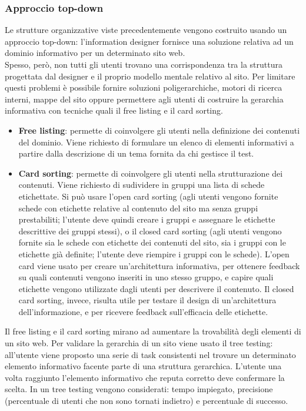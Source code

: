 \documentclass{article}
\begin{document}
\subsubsection{Approccio top-down}
Le strutture organizzative viste precedentemente vengono costruito usando un approccio top-down: l'information designer fornisce una soluzione relativa ad un dominio informativo per un determinato sito web.\\
Spesso, però, non tutti gli utenti trovano una corrispondenza tra la struttura progettata dal designer e il proprio modello mentale relativo al sito. Per limitare questi problemi è possibile fornire soluzioni poligerarchiche, motori di ricerca interni, mappe del sito oppure permettere agli utenti di costruire la gerarchia informativa con tecniche quali il free listing e il card sorting.
\begin{itemize}
	\item \textbf{Free listing}: permette di coinvolgere gli utenti nella definizione dei contenuti del dominio. Viene richiesto di formulare un elenco di elementi informativi a partire dalla descrizione di un tema fornita da chi gestisce il test.
	\item \textbf{Card sorting}: permette di coinvolgere gli utenti nella strutturazione dei contenuti. Viene richiesto di sudividere in gruppi una lista di schede etichettate. Si può usare l'open card sorting (agli utenti vengono fornite schede con etichette relative al contenuto del sito ma senza gruppi prestabiliti; l'utente deve quindi creare i gruppi e assegnare le etichette descrittive dei gruppi stessi), o il closed card sorting (agli utenti vengono fornite sia le schede con etichette dei contenuti del sito, sia i gruppi con le etichette già definite; l'utente deve riempire i gruppi con le schede). L'open card viene usato per creare un'architettura informativa, per ottenere feedback su quali contenuti vengono inseriti in uno stesso gruppo, e capire quali etichette vengono utilizzate dagli utenti per descrivere il contenuto.
	Il closed card sorting, invece, risulta utile per testare il design di un'architettura dell'informazione, e per ricevere feedback sull'efficacia delle etichette.
\end{itemize}
Il free listing e il card sorting mirano ad aumentare la trovabilità degli elementi di un sito web.
Per validare la gerarchia di un sito viene usato il tree testing: all'utente viene proposto una serie di task consistenti nel trovare un determinato elemento informativo facente parte di una struttura gerarchica. L'utente una volta raggiunto l'elemento informativo che reputa corretto deve confermare la scelta. In un tree testing vengono considerati: tempo impiegato, precisione (percentuale di utenti che non sono tornati indietro) e percentuale di successo.
\end{document}
